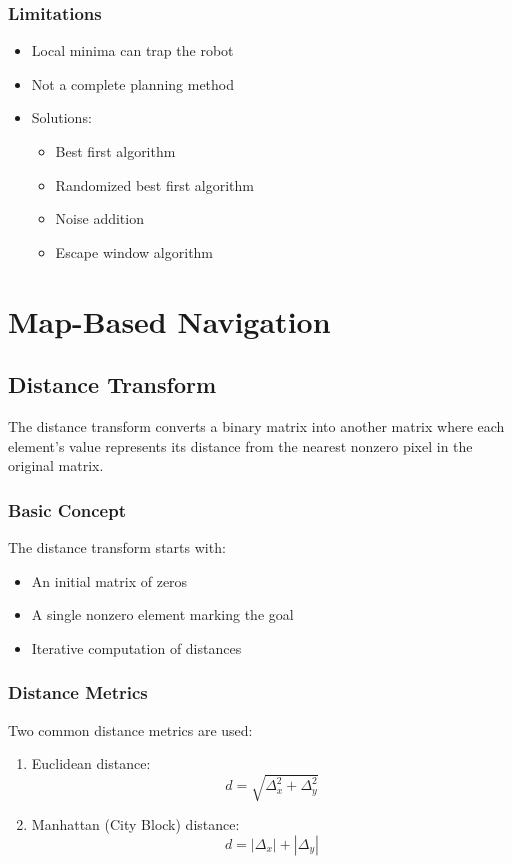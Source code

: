 \documentclass[openany]{book}
\theoremstyle{definition}
\theoremstyle{remark}
\newcommand{\definitionbox}[1]{
\begin{tcolorbox}[colback=blue!5,colframe=blue!40!black,title=Definition]
 #1
\end{tcolorbox}
}
\begin{document}
\subsection{Limitations}
\begin{itemize}
    \item Local minima can trap the robot
    \item Not a complete planning method
    \item Solutions:
    \begin{itemize}
        \item Best first algorithm
        \item Randomized best first algorithm
        \item Noise addition
        \item Escape window algorithm
    \end{itemize}
\end{itemize}


\chapter{Map-Based Navigation}

\section{Distance Transform}

\definitionbox{The distance transform converts a binary matrix into another matrix where each element's value represents its distance from the nearest nonzero pixel in the original matrix.}

\subsection{Basic Concept}
The distance transform starts with:
\begin{itemize}
    \item An initial matrix of zeros
    \item A single nonzero element marking the goal
    \item Iterative computation of distances
\end{itemize}

\subsection{Distance Metrics}
Two common distance metrics are used:

\begin{enumerate}
    \item Euclidean distance:
    \begin{equation}
        d = \sqrt{\Delta_x^2 + \Delta_y^2}
    \end{equation}
    
    \item Manhattan (City Block) distance:
    \begin{equation}
        d = |\Delta_x| + |\Delta_y|
    \end{equation}
\end{enumerate}
\end{document}
